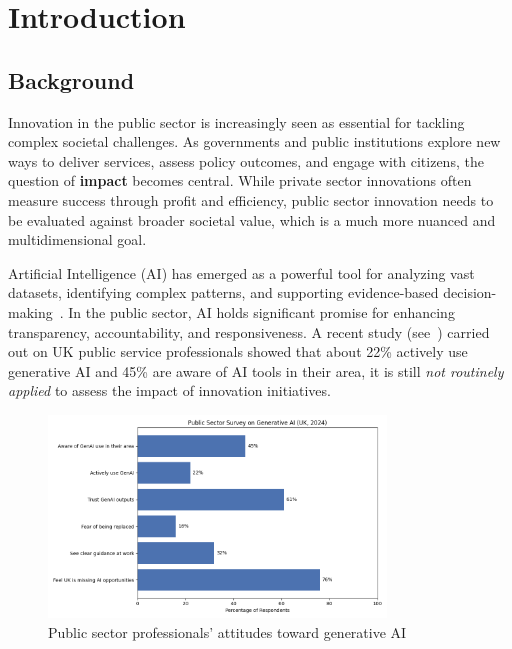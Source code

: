 
\chapter{Introduction}\label{ch:introduction}


\section{Background}\label{sec:background}

Innovation in the public sector is increasingly seen as essential for tackling complex societal challenges.
As governments and public institutions explore new ways to deliver services, assess policy outcomes, and engage with citizens, the question of \textbf{impact} becomes central.
While private sector innovations often measure success through profit and efficiency, public sector innovation needs to be evaluated against broader societal value, which is a much more nuanced and multidimensional goal.

Artificial Intelligence (AI) has emerged as a powerful tool for analyzing vast datasets, identifying complex patterns, and supporting evidence-based decision-making~\parencite{russell2016artificial, marr2018data}.
In the public sector, AI holds significant promise for enhancing transparency, accountability, and responsiveness.
A recent study (see~\cite{cornell2024}) carried out on UK public service professionals showed that about 22\% actively use generative AI and 45\% are aware of AI tools in their area, it is still \textit{not routinely applied} to assess the impact of innovation initiatives.


\begin{figure}[H]
  \centering
  \includegraphics[width=0.8\textwidth]{../fig/ai_awareness_uk}
  \caption{Public sector professionals' attitudes toward generative AI ~\parencite{cornell2024}}
  \label{fig:genai_survey}
\end{figure}


